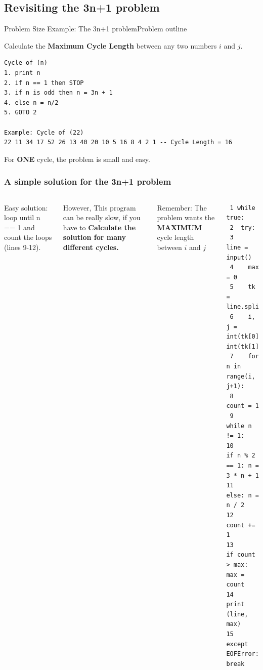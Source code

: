 
\subsection{Revisiting the 3n+1 problem}

\begin{frame}[fragile]{Problem Size Example: The 3n+1 problem}{Problem outline}

  \begin{block}{}
    Calculate the {\bf Maximum Cycle Length} between any two numbers $i$ and $j$.
  \end{block}
  \smallskip

\begin{verbatim}
Cycle of (n)
1. print n
2. if n == 1 then STOP
3. if n is odd then n = 3n + 1
4. else n = n/2
5. GOTO 2

Example: Cycle of (22)
22 11 34 17 52 26 13 40 20 10 5 16 8 4 2 1 -- Cycle Length = 16
\end{verbatim}
For {\bf ONE} cycle, the problem is small and easy.
\end{frame}

\begin{frame}[fragile]
  \frametitle{A simple solution for the 3n+1 problem}
  \begin{columns}
    Easy solution: loop until n == 1 and count the loops (lines 9-12).\bigskip

    However, This program can be really slow,
    if you have to {\bf Calculate the solution for many different cycles.}\bigskip

    Remember: The problem wants the {\bf MAXIMUM} cycle length between $i$ and $j$
  {\smaller
\begin{verbatim}
 1 while true:
 2  try:
 3    line = input()
 4    max = 0
 5    tk = line.split()
 6    i, j = int(tk[0]), int(tk[1])
 7    for n in range(i, j+1):
 8      count = 1
 9      while n != 1:
10        if n % 2 == 1: n = 3 * n + 1
11        else: n = n / 2
12        count += 1
13      if count > max: max = count
14    print (line, max)
15  except EOFError: break
\end{verbatim}}
\end{columns}
\end{frame}

